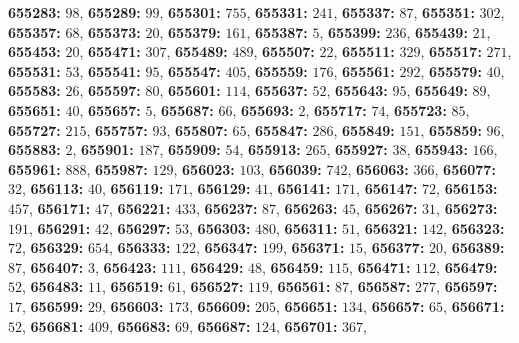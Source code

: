 \textsf{\bfseries 655283:} $98$, \textsf{\bfseries 655289:} $99$, \textsf{\bfseries 655301:} $755$, \textsf{\bfseries 655331:} $241$, \textsf{\bfseries 655337:} $87$, \textsf{\bfseries 655351:} $302$, \textsf{\bfseries 655357:} $68$, \textsf{\bfseries 655373:} $20$, \textsf{\bfseries 655379:} $161$, \textsf{\bfseries 655387:} $5$, \textsf{\bfseries 655399:} $236$, \textsf{\bfseries 655439:} $21$, \textsf{\bfseries 655453:} $20$, \textsf{\bfseries 655471:} $307$, \textsf{\bfseries 655489:} $489$, \textsf{\bfseries 655507:} $22$, \textsf{\bfseries 655511:} $329$, \textsf{\bfseries 655517:} $271$, \textsf{\bfseries 655531:} $53$, \textsf{\bfseries 655541:} $95$, \textsf{\bfseries 655547:} $405$, \textsf{\bfseries 655559:} $176$, \textsf{\bfseries 655561:} $292$, \textsf{\bfseries 655579:} $40$, \textsf{\bfseries 655583:} $26$, \textsf{\bfseries 655597:} $80$, \textsf{\bfseries 655601:} $114$, \textsf{\bfseries 655637:} $52$, \textsf{\bfseries 655643:} $95$, \textsf{\bfseries 655649:} $89$, \textsf{\bfseries 655651:} $40$, \textsf{\bfseries 655657:} $5$, \textsf{\bfseries 655687:} $66$, \textsf{\bfseries 655693:} $2$, \textsf{\bfseries 655717:} $74$, \textsf{\bfseries 655723:} $85$, \textsf{\bfseries 655727:} $215$, \textsf{\bfseries 655757:} $93$, \textsf{\bfseries 655807:} $65$, \textsf{\bfseries 655847:} $286$, \textsf{\bfseries 655849:} $151$, \textsf{\bfseries 655859:} $96$, \textsf{\bfseries 655883:} $2$, \textsf{\bfseries 655901:} $187$, \textsf{\bfseries 655909:} $54$, \textsf{\bfseries 655913:} $265$, \textsf{\bfseries 655927:} $38$, \textsf{\bfseries 655943:} $166$, \textsf{\bfseries 655961:} $888$, \textsf{\bfseries 655987:} $129$, \textsf{\bfseries 656023:} $103$, \textsf{\bfseries 656039:} $742$, \textsf{\bfseries 656063:} $366$, \textsf{\bfseries 656077:} $32$, \textsf{\bfseries 656113:} $40$, \textsf{\bfseries 656119:} $171$, \textsf{\bfseries 656129:} $41$, \textsf{\bfseries 656141:} $171$, \textsf{\bfseries 656147:} $72$, \textsf{\bfseries 656153:} $457$, \textsf{\bfseries 656171:} $47$, \textsf{\bfseries 656221:} $433$, \textsf{\bfseries 656237:} $87$, \textsf{\bfseries 656263:} $45$, \textsf{\bfseries 656267:} $31$, \textsf{\bfseries 656273:} $191$, \textsf{\bfseries 656291:} $42$, \textsf{\bfseries 656297:} $53$, \textsf{\bfseries 656303:} $480$, \textsf{\bfseries 656311:} $51$, \textsf{\bfseries 656321:} $142$, \textsf{\bfseries 656323:} $72$, \textsf{\bfseries 656329:} $654$, \textsf{\bfseries 656333:} $122$, \textsf{\bfseries 656347:} $199$, \textsf{\bfseries 656371:} $15$, \textsf{\bfseries 656377:} $20$, \textsf{\bfseries 656389:} $87$, \textsf{\bfseries 656407:} $3$, \textsf{\bfseries 656423:} $111$, \textsf{\bfseries 656429:} $48$, \textsf{\bfseries 656459:} $115$, \textsf{\bfseries 656471:} $112$, \textsf{\bfseries 656479:} $52$, \textsf{\bfseries 656483:} $11$, \textsf{\bfseries 656519:} $61$, \textsf{\bfseries 656527:} $119$, \textsf{\bfseries 656561:} $87$, \textsf{\bfseries 656587:} $277$, \textsf{\bfseries 656597:} $17$, \textsf{\bfseries 656599:} $29$, \textsf{\bfseries 656603:} $173$, \textsf{\bfseries 656609:} $205$, \textsf{\bfseries 656651:} $134$, \textsf{\bfseries 656657:} $65$, \textsf{\bfseries 656671:} $52$, \textsf{\bfseries 656681:} $409$, \textsf{\bfseries 656683:} $69$, \textsf{\bfseries 656687:} $124$, \textsf{\bfseries 656701:} $367$, 
